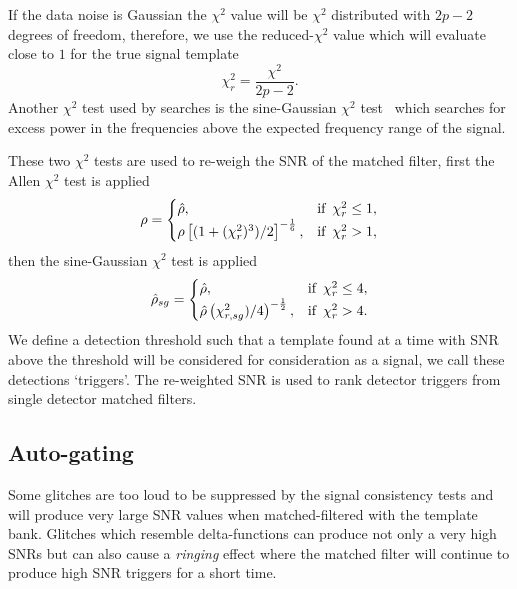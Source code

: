 If the data noise is Gaussian the $\chi^{2}$ value will be $\chi^{2}$ distributed with $2p - 2$ degrees of freedom, therefore, we use the reduced-$\chi^{2}$ value which will evaluate close to $1$ for the true signal template
%
\begin{equation}
    \chi_{r}^{2} = \frac{\chi^{2}}{2p-2}.
    \label{2:eq:reduced_chisq}
\end{equation}
%
Another $\chi^{2}$ test used by \gwadj searches is the sine-Gaussian $\chi^{2}$ test~\cite{PyCBC_sg:2018} which searches for excess power in the frequencies above the expected frequency range of the signal.

These two $\chi^{2}$ tests are used to re-weigh the SNR of the matched filter, first the Allen $\chi^{2}$ test is applied~\cite{McIsaac_Chi:2022}
%
\begin{equation}
    \rho =
    \begin{cases}
        \hat{\rho}, & \text{if \,} \chi^{2}_{r} \le 1, \\
        \rho\left[(1 + (\chi^{2}_{r})^{3}) /2\right]^{-\frac{1}{6}}, & \text{if \,} \chi^{2}_{r} > 1,
    \end{cases}
\end{equation}
%
then the sine-Gaussian $\chi^{2}$ test is applied
%
\begin{equation}
    \hat{\rho}_{sg} =
    \begin{cases}
        \hat{\rho}, & \text{if \,} \chi^{2}_{r} \le 4, \\
        \hat{\rho}\left(\chi^{2}_{r, sg})/4\right)^{-\frac{1}{2}}, & \text{if \,} \chi^{2}_{r} > 4.
    \end{cases}
\end{equation}
%
We define a detection threshold such that a template found at a time with SNR above the threshold will be considered for consideration as a \gwadj signal, we call these detections `triggers'. The re-weighted SNR is used to rank detector triggers from single detector matched filters.

\subsection{\label{2:sec:auto-gating}Auto-gating}

Some glitches are too loud to be suppressed by the signal consistency tests and will produce very large SNR values when matched-filtered with the template bank. Glitches which resemble delta-functions can produce not only a very high SNRs but can also cause a \textit{ringing} effect where the matched filter will continue to produce high SNR triggers for a short time.

